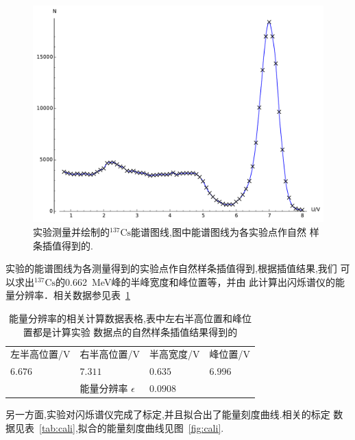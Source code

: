 \documentclass[aps,pre,12pt,preprint,onecolumn,showpacs,showkeys]{revtex4-1}
\begin{document}
\begin{figure}[htbp]
  \centering
\includegraphics[width=\textwidth]{plot1.pdf}
\caption{\label{fig:plot}%
实验测量并绘制的$^{137}\text{Cs}$能谱图线,图中能谱图线为各实验点作自然
样条插值得到的.}
\end{figure}

实验的能谱图线为各测量得到的实验点作自然样条插值得到,根据插值结果,我们
可以求出$^{137}\text{Cs}$的\SI{0.662}{MeV}峰的半峰宽度和峰位置等，并由
此计算出闪烁谱仪的能量分辨率．相关数据参见表~\ref{tab:energy}


\begin{table}[htbp]
  \caption{\label{tab:energy}%
    能量分辨率的相关计算数据表格,表中左右半高位置和峰位置都是计算实验
    数据点的自然样条插值结果得到的}
\begin{ruledtabular}
  \begin{tabular}{llll}
    左半高位置/\si{V}& 右半高位置/\si{V} & 半高宽度/\si{V} & 峰位置/\si{V}  \\
    $6.676$&$7.311$&$0.635$&$6.996$ \\
    \colrule
 & 能量分辨率 $\epsilon$ & $0.0908$& 

\end{tabular}
\end{ruledtabular}
\end{table}
 

另一方面,实验对闪烁谱仪完成了标定,并且拟合出了能量刻度曲线.相关的标定
数据见表~\ref{tab:cali},拟合的能量刻度曲线见图~\ref{fig:cali}.
\end{document}
